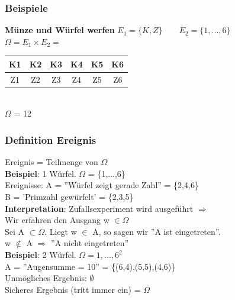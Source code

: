 \subsubsection{Beispiele}
\textbf{Münze und Würfel werfen}
$E_1 = \{K,Z\} \qquad E_2 = \{1,...,6\}$\\
$\Omega = E_1 \times E_2 = $\begin{tabular}{|c|c|c|c|c|c|}
	\hline 
K1	&K2  &K3  &K4  &K5  &K6  \\ 
	\hline 
Z1	& Z2 & Z3 &Z4  &Z5  &Z6  \\ 
	\hline 
\end{tabular} \\
 $\Omega$ = 12
\subsubsection{Definition Ereignis}
Ereignis = Teilmenge von $\Omega$\\
\textbf{Beispiel}: 1 Würfel. $\Omega$ = \{1,...,6\}\\
Ereignisse: A = ''Würfel zeigt gerade Zahl'' = \{2,4,6\}\\
B = 'Primzahl gewürfelt' = \{2,3,5\}\medskip\\
\textbf{Interpretation}: Zufallsexperiment wird ausgeführt $\Rightarrow$ \\
Wir erfahren den Ausgang w $\in \Omega$\\
Sei A $\subset \Omega$. Liegt w $\in$ A, so sagen wir ''A ist eingetreten''. \\
w $\notin$ A $\Rightarrow$ ''A nicht eingetreten''\medskip\\
\textbf{Beispiel}: 2 Würfel. $\Omega = {1,...,6}^2$\\
A = ''Augensumme  = 10'' = \{(6,4),(5,5),(4,6)\}\medskip\\
Unmögliches Ergebnis: $\emptyset$\\
Sicheres Ergebnis (tritt immer ein) = $\Omega$\newpage
